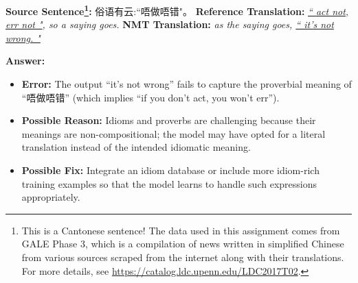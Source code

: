 \begin{parts}
\begin{subparts}
        \subpart[2] 
        \textbf{Source Sentence\footnote{This is a Cantonese sentence! The data used in this assignment comes from GALE Phase 3, which is a compilation of news written in simplified Chinese from various sources scraped from the internet along with their translations. For more details, see \url{https://catalog.ldc.upenn.edu/LDC2017T02}. }:} 俗语有云:``唔做唔错"。\newline
        \textbf{Reference Translation:} \textit{\underline{`` act not, err not "}, so a saying goes.}\newline
        \textbf{NMT Translation:} \textit{as the saying goes, \underline{`` it's not wrong. "}}

        {\color{red}
            \textbf{Answer:}
            \begin{itemize}
                \item \textbf{Error:} The output “it’s not wrong” fails to capture the proverbial meaning of “唔做唔错” (which implies “if you don’t act, you won’t err”).
                \item \textbf{Possible Reason:} Idioms and proverbs are challenging because their meanings are non-compositional; the model may have opted for a literal translation instead of the intended idiomatic meaning.
                \item \textbf{Possible Fix:} Integrate an idiom database or include more idiom-rich training examples so that the model learns to handle such expressions appropriately.
            \end{itemize}
        }
        
    \end{subparts}



\end{parts}
